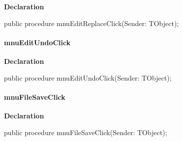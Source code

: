 \documentclass{report}
\newif\ifpdf
\begin{document}
\label{editor.TFrmEditor-mnuEditReplaceClick}
\begin{list}{}{
\setlength{\itemindent}{0cm}
\setlength{\listparindent}{0cm}
\setlength{\leftmargin}{\evensidemargin}
\addtolength{\leftmargin}{\tmplength}
\settowidth{\labelsep}{X}
\addtolength{\leftmargin}{\labelsep}
\setlength{\labelwidth}{\tmplength}
}
\item[\textbf{Declaration}\hfill]
\ifpdf
\begin{flushleft}
\fi
\begin{ttfamily}
public procedure mnuEditReplaceClick(Sender: TObject);\end{ttfamily}

\ifpdf
\end{flushleft}
\fi

\end{list}
\paragraph*{mnuEditUndoClick}\hspace*{\fill}

\label{editor.TFrmEditor-mnuEditUndoClick}
\begin{list}{}{
\setlength{\itemindent}{0cm}
\setlength{\listparindent}{0cm}
\setlength{\leftmargin}{\evensidemargin}
\addtolength{\leftmargin}{\tmplength}
\settowidth{\labelsep}{X}
\addtolength{\leftmargin}{\labelsep}
\setlength{\labelwidth}{\tmplength}
}
\item[\textbf{Declaration}\hfill]
\ifpdf
\begin{flushleft}
\fi
\begin{ttfamily}
public procedure mnuEditUndoClick(Sender: TObject);\end{ttfamily}

\ifpdf
\end{flushleft}
\fi

\end{list}
\paragraph*{mnuFileSaveClick}\hspace*{\fill}

\label{editor.TFrmEditor-mnuFileSaveClick}
\begin{list}{}{
\setlength{\itemindent}{0cm}
\setlength{\listparindent}{0cm}
\setlength{\leftmargin}{\evensidemargin}
\addtolength{\leftmargin}{\tmplength}
\settowidth{\labelsep}{X}
\addtolength{\leftmargin}{\labelsep}
\setlength{\labelwidth}{\tmplength}
}
\item[\textbf{Declaration}\hfill]
\ifpdf
\begin{flushleft}
\fi
\begin{ttfamily}
public procedure mnuFileSaveClick(Sender: TObject);\end{ttfamily}

\ifpdf
\end{flushleft}
\fi

\end{list}
\end{document}
